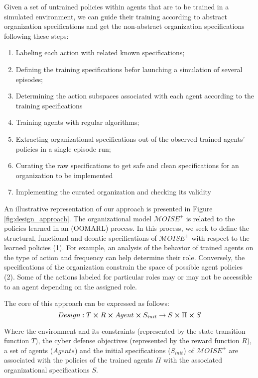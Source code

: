 \documentclass[runningheads]{llncs}
\begin{document}
Given a set of untrained policies within agents that are to be trained in a simulated environment, we can guide their training according to abstract organization specifications and get the non-abstract organization specifications following these steps:
\begin{enumerate}
    \item Labeling each action with related known specifications;
    \item Defining the training specifications befor launching a simulation of several episodes;
    \item Determining the action subspaces associated with each agent according to the training specifications
    \item Training agents with regular algorithms;
    \item Extracting organizational specifications out of the observed trained agents' policies in a single episode run;
    \item Curating the raw specifications to get safe and clean specifications for an organization to be implemented
    \item Implementing the curated organization and checking its validity
\end{enumerate}

An illustrative representation of our approach is presented in Figure \ref{fig:design_approach}. The organizational model $\mathcal{M}OISE^{+}$ is related to the policies learned in an  (OOMARL) process. In this process, we seek to define the structural, functional and deontic specifications of $\mathcal{M}OISE^{+}$ with respect to the learned policies (1). For example, an analysis of the behavior of trained agents on the type of action and frequency can help determine their role. Conversely, the specifications of the organization constrain the space of possible agent policies (2). Some of the actions labeled for particular roles may or may not be accessible to an agent depending on the assigned role.

The core of this approach can be expressed as follows:\begin{equation} %
    Design: T \cross R \cross Agent \cross S_{init} \rightarrow S \cross \Pi \cross S
\end{equation}

Where the environment and its constraints (represented by the state transition function $T$), the cyber defense objectives (represented by the reward function $R$), a set of agents ($Agents$) and the initial specifications ($S_{init}$) of $\mathcal{M}OISE^{+}$ are associated with the policies of the trained agents $\Pi$ with the associated organizational specifications $S$.
\end{document}
